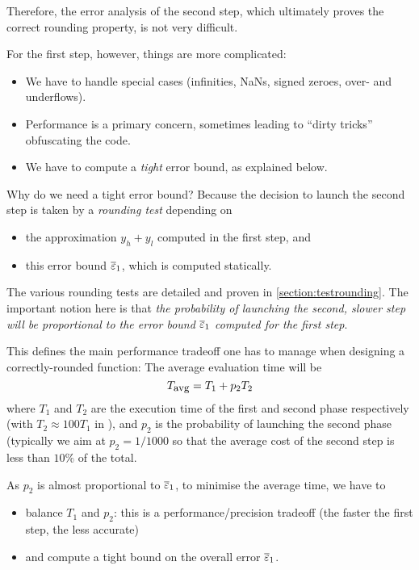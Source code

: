 Therefore, the error analysis of the second step, which ultimately
proves the correct rounding property, is not very difficult.

For the first step, however, things are more complicated:
\begin{itemize}
\item We have to handle special cases (infinities, NaNs, signed
  zeroes, over- and underflows).
\item Performance is a primary concern, sometimes leading to ``dirty
  tricks'' obfuscating the code.
\item We have to compute a \emph{tight} error bound, as explained below.
\end{itemize}

Why do we need a tight error bound? Because the decision to launch the
second step is taken by a \emph{rounding test}  depending on
\begin{itemize}
\item the approximation $y_h+y_l$ computed in the first step, and
\item this error bound ${\overline{\varepsilon}}_1$, which is computed statically.
\end{itemize}

The various rounding tests are detailed and proven in
\ref{section:testrounding}.  The important notion here is that
\emph{the probability of launching the second, slower step will be
  proportional to the error bound ${\overline{\varepsilon}}_1$ computed for the first step}.

This defines the main performance tradeoff one has to manage when
designing a correctly-rounded function: The average evaluation time
will be
\begin{equation}
  T_{\mbox{\small avg}} = T_1 + p_2T_2 \label{eq:Tavg}
\end{equation}
where $T_1$ and $T_2$ are the execution time of the first and second
phase respectively (with $T_2\approx 100T_1$ in \crlibm), and $p_2$ is
the probability of launching the second phase (typically we aim at
$p_2=1/1000$ so that the average cost of the second step is less than
$10\%$ of the total.  

As $p_2$ is almost proportional to ${\overline{\varepsilon}}_1$, to minimise the average
time, we have to
\begin{itemize}
\item balance $T_1$ and $p_2$: this is a performance/precision
  tradeoff (the faster the first step, the less accurate)
\item and compute a tight bound on the overall error  ${\overline{\varepsilon}}_1$.
\end{itemize}

